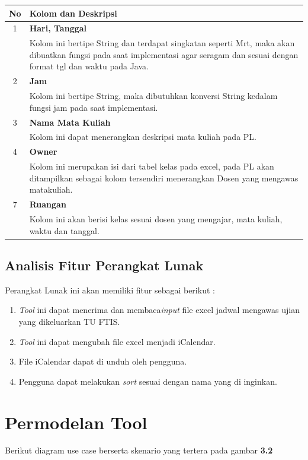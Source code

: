 \begin{tabular}{|c|p{12cm}|}
		\hline
		\textbf{No} & \textbf{Kolom dan Deskripsi} \\ \hline \hline
		1 & \textbf{Hari, Tanggal}\\
			&	Kolom ini bertipe String dan terdapat singkatan seperti Mrt, maka akan dibuatkan fungsi pada saat implementasi agar seragam dan sesuai dengan format tgl dan waktu pada Java.\\ \hline	
		2 & \textbf{Jam}\\
			&	Kolom ini bertipe String, maka dibutuhkan konversi String kedalam fungsi jam pada saat implementasi.\\ \hline
		3 & \textbf{Nama Mata Kuliah}\\
			&	Kolom ini dapat menerangkan deskripsi mata kuliah pada PL.\\ \hline
		4 & \textbf{Owner}\\
			&	Kolom ini merupakan isi dari tabel kelas pada excel, pada PL akan ditampilkan sebagai kolom tersendiri menerangkan Dosen yang mengawas matakuliah.\\ \hline		
		7 & \textbf{Ruangan}\\
			&	Kolom ini akan berisi kelas sesuai dosen yang mengajar, mata kuliah, waktu dan tanggal.\\ \hline
	\end{tabular}

\subsection{Analisis Fitur Perangkat Lunak}
Perangkat Lunak ini akan memiliki fitur sebagai berikut : 
	\begin{enumerate}
		\item \textit{Tool} ini dapat menerima dan membaca\textit{input} file excel jadwal mengawas ujian yang dikeluarkan TU FTIS.
		\item \textit{Tool} ini dapat mengubah file excel menjadi iCalendar.
		\item File iCalendar dapat di unduh oleh pengguna.
		\item Pengguna dapat melakukan \textit{sort} sesuai dengan nama yang di inginkan.
	\end{enumerate}
	
\section{Permodelan Tool}

Berikut diagram use case berserta skenario yang tertera pada gambar \textbf{3.2}

